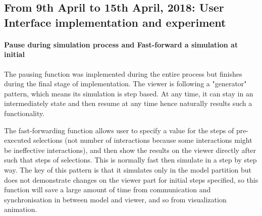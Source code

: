 \subsection{From 9th April to 15th April, 2018: User Interface implementation and experiment}
\paragraph{Pause during simulation process and Fast-forward a simulation at initial}
The pausing function was implemented during the entire process but finishes during the final stage of implementation.
The viewer is following a "generator" pattern, which means its simulation is step based. At any time, it can stay in an intermediately
state and then resume at any time hence naturally results such a functionality.
\par\noindent
The fast-forwarding function allows user to specify a value for the steps of pre-executed selections (not number of interactions because some interactions might be ineffective interactions),
and then show the results on the viewer directly after such that steps of selections. This is normally fast then simulate in a step by step way. The key of this pattern is that
it simulates only in the model partition but does not demonstrate changes on the viewer part for initial steps specified, so this function will save a large amount of time from communication and synchronisation in between
model and viewer, and so from visualization animation.
